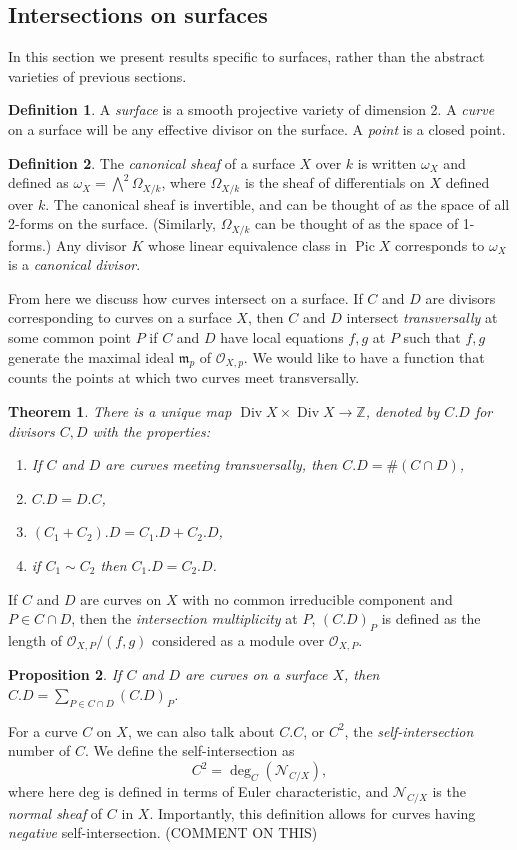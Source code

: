 \documentclass[12pt,twoside]{reedthesis}
\theoremstyle{plain}
\newtheorem{theorem}{Theorem}[chapter]
\newtheorem{proposition}[theorem]{Proposition}
\theoremstyle{definition}
\newtheorem{definition}{Definition}[section]
\theoremstyle{remark}
\newcommand{\ZZ}{\mathbb{Z}}
\newcommand{\calO}{\mathcal{O}}
\newcommand{\Div}{\operatorname{Div}}
\newcommand{\Pic}{\operatorname{Pic}}
\begin{document}
\subsection{Intersections on surfaces}
In this section we present results specific to surfaces, rather than the abstract varieties of previous sections.
\begin{definition}
A \emph{surface} is a smooth projective variety of dimension 2. A \emph{curve} on a surface will be any effective divisor on the surface. A \emph{point} is a closed point.
\end{definition}
\begin{definition}
The \emph{canonical sheaf} of a surface $X$ over $k$ is written $\omega_X$ and defined as $\omega_X=\bigwedge^2\Omega_{X/k}$, where $\Omega_{X/k}$ is the sheaf of differentials on $X$ defined over $k$. The canonical sheaf is invertible, and can be thought of as the space of all 2-forms on the surface. (Similarly, $\Omega_{X/k}$ can be thought of as the space of 1-forms.) Any divisor $K$ whose linear equivalence class in $\Pic X$ corresponds to $\omega_X$ is a \emph{canonical divisor}.
\end{definition}
From here we discuss how curves intersect on a surface. If $C$ and $D$ are divisors corresponding to curves on a surface $X$, then $C$ and $D$ intersect \emph{transversally} at some common point $P$ if $C$ and $D$ have local equations $f,g$ at $P$ such that $f,g$ generate the maximal ideal $\mathfrak{m}_p$ of $\calO_{X,p}$. We would like to have a function that counts the points at which two curves meet transversally.
\begin{theorem}
There is a unique map $\Div X\times \Div X\to\ZZ$, denoted by $C.D$ for divisors $C,D$ with the properties:
\begin{enumerate}
\item If $C$ and $D$ are curves meeting transversally, then $C.D=\#(C\cap D)$,
\item $C.D=D.C$,
\item $(C_1+C_2).D=C_1.D+C_2.D$,
\item if $C_1\sim C_2$ then $C_1.D=C_2.D$.
\end{enumerate}
\end{theorem}
\noindent If $C$ and $D$ are curves on $X$ with no common irreducible component and $P\in C\cap D$, then the \emph{intersection multiplicity} at $P$, $(C.D)_P$ is defined as the length of $\calO_{X,P}/(f,g)$ considered as a module over $\calO_{X,P}$.
\begin{proposition}
 If $C$ and $D$ are curves on a surface $X$, then $C.D=\sum_{P\in C\cap D} (C.D)_P$.
\end{proposition}
For a curve $C$ on $X$, we can also talk about $C.C$, or $C^2$, the \emph{self-intersection} number of $C$. We define the self-intersection as \[C^2=\deg_C(\mathscr{N}_{C/X}),\] where here deg is defined in terms of Euler characteristic, and $\mathscr{N}_{C/X}$ is the \emph{normal sheaf} of $C$ in $X$. Importantly, this definition allows for curves having \emph{negative} self-intersection. (COMMENT ON THIS)
\end{document}

